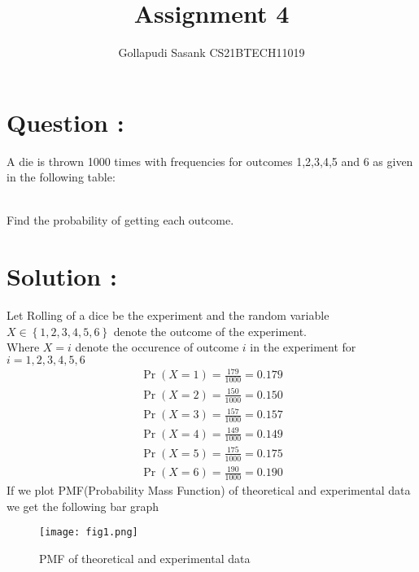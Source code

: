 \documentclass[twocolumn]{article}
\title{Assignment 4}
\author{Gollapudi Sasank CS21BTECH11019}
\providecommand{\pr}[1]{\ensuremath{\Pr\left(#1\right)}}
\providecommand{\cbrak}[1]{\ensuremath{\left\{#1\right\}}}
\begin{document}
\maketitle
\section*{Question : }
A die is thrown 1000 times with frequencies for outcomes 1,2,3,4,5 and 6 as given in the following table:
\begin{table}[ht]

\centering
\caption{}
\label{table:table 1}
\end{table}\\
Find the probability of getting each outcome.
\section*{Solution : }
Let Rolling of a dice be the experiment and the random variable $X \in \cbrak{1,2,3,4,5,6}$  denote the outcome of the experiment.\\
Where $X = i $ denote the occurence of outcome $i$ in the experiment for $ i = 1,2,3,4,5,6 $
\begin{align}
\pr{X = 1} = \frac{179}{1000} = 0.179 \\
\pr{X = 2} = \frac{150}{1000} = 0.150 \\
\pr{X = 3} = \frac{157}{1000} = 0.157 \\
\pr{X = 4} = \frac{149}{1000} = 0.149 \\
\pr{X = 5} = \frac{175}{1000} = 0.175 \\
\pr{X = 6} = \frac{190}{1000} = 0.190 
\end{align}
If we plot PMF(Probability Mass Function) of theoretical and experimental data we get the following bar graph 
\begin{figure}[h!]
\texttt{[image: fig1.png]}
\caption{PMF of theoretical and experimental data}
\label{Fig 1}
\end{figure}
\end{document}
